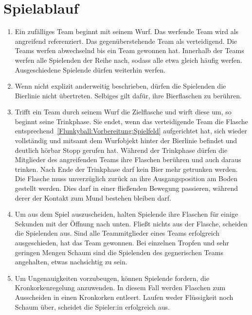 \section{Spielablauf}
\begin{enumerate}[label={(\arabic*)}]    
    \item
    Ein zufälliges Team beginnt mit seinem Wurf.
    Das werfende Team wird als \glqq{}angreifend\grqq{} referenziert.
    Das gegenüberstehende Team als \glqq{}verteidigend\grqq{}.
    Die Teams werfen abwechselnd bis ein Team gewonnen hat.
    Innerhalb der Teams werfen alle Spielenden der Reihe nach, sodass alle etwa gleich häufig werfen.
    Ausgeschiedene Spielende dürfen weiterhin werfen.

    \item
    Wenn nicht explizit anderweitig beschrieben, dürfen die Spielenden die Bierlinie nicht übertreten.
    Selbiges gilt dafür, ihre Bierflaschen zu berühren.

    \item
    Trifft ein Team durch seinem Wurf die Zielflasche und wirft diese um, so beginnt seine Trinkphase.
    Sie endet, wenn das verteidigende Team die Flasche entsprechend~\ref{Flunkyball:Vorbereitung:Spielfeld} aufgerichtet hat, sich wieder vollständig und mitsamt dem Wurfobjekt hinter der Bierlinie befindet und deutlich hörbar \glqq{}Stopp\grqq{} gerufen hat.
    Während der Trinkphase dürfen die Mitglieder des angreifenden Teams ihre Flaschen berühren und auch daraus trinken.
    Nach Ende der Trinkphase darf kein Bier mehr getrunken werden.
    Die Flasche muss unverzüglich zurück an ihre Ausgangsposition am Boden gestellt werden.
    Dies darf in einer fließenden Bewegung passieren, während derer der Kontakt zum Mund bestehen bleiben darf.

    \item
    Um aus dem Spiel auszuscheiden, halten Spielende ihre Flaschen für einige Sekunden mit der Öffnung nach unten.
    Fließt nichts aus der Flasche, scheiden die Spielenden aus.
    Sind alle Teammitglieder eines Teams erfolgreich ausgeschieden, hat das Team gewonnen.
    Bei einzelnen Tropfen und sehr geringen Mengen Schaum sind die Spielenden des gegnerischen Teams angehalten, etwas nachsichtig zu sein.

    \item
    Um Ungenauigkeiten vorzubeugen, können Spielende fordern, die Kronkorkenregelung anzuwenden.
    In diesem Fall werden Flaschen zum Ausscheiden in einen Kronkorken entleert.
    Laufen weder Flüssigkeit noch Schaum über, scheidet die Spieler:in erfolgreich aus.
\end{enumerate}

